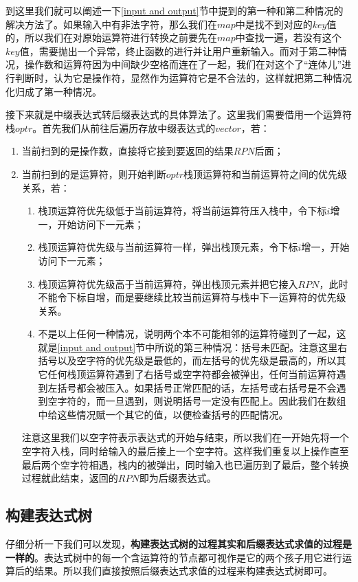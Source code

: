 \documentclass[UTF8]{ctexart}
\begin{document}
		\indent 到这里我们就可以阐述一下\ref{input and output}节中提到的第一种和第二种情况的解决方法了。如果输入中有非法字符，那么我们在$map$中是找不到对应的$key$值的，所以我们在对原始运算符进行转换之前要先在$map$中查找一遍，若没有这个$key$值，需要抛出一个异常，终止函数的进行并让用户重新输入。而对于第二种情况，操作数和运算符因为中间缺少空格而连在了一起，我们在对这个了“连体儿”进行判断时，认为它是操作符，显然作为运算符它是不合法的，这样就把第二种情况化归成了第一种情况。
		
		\indent 接下来就是中缀表达式转后缀表达式的具体算法了。这里我们需要借用一个运算符栈$optr$。首先我们从前往后遍历存放中缀表达式的$vector$，若：
		\begin{enumerate}
			\item 当前扫到的是操作数，直接将它接到要返回的结果$RPN$后面；
			\item 当前扫到的是运算符，则开始判断$optr$栈顶运算符和当前运算符之间的优先级关系，若：
			\begin{enumerate}
				\item 栈顶运算符优先级低于当前运算符，将当前运算符压入栈中，令下标$i$增一，开始访问下一元素；
				\item 栈顶运算符优先级与当前运算符一样，弹出栈顶元素，令下标$i$增一，开始访问下一元素；
				\item 栈顶运算符优先级高于当前运算符，弹出栈顶元素并把它接入$RPN$，此时不能令下标自增，而是要继续比较当前运算符与栈中下一运算符的优先级关系。
				\item 不是以上任何一种情况，说明两个本不可能相邻的运算符碰到了一起，这就是\ref{input and output}节中所说的第三种情况：括号未匹配。注意这里右括号以及空字符的优先级是最低的，而左括号的优先级是最高的，所以其它任何栈顶运算符遇到了右括号或空字符都会被弹出，任何当前运算符遇到左括号都会被压入。如果括号正常匹配的话，左括号或右括号是不会遇到空字符的，而一旦遇到，则说明括号一定没有匹配上。因此我们在数组中给这些情况赋一个其它的值，以便检查括号的匹配情况。
			\end{enumerate}
		\indent 注意这里我们以空字符表示表达式的开始与结束，所以我们在一开始先将一个空字符入栈，同时给输入的最后接上一个空字符。这样我们重复以上操作直至最后两个空字符相遇，栈内的被弹出，同时输入也已遍历到了最后，整个转换过程就此结束，返回的$RPN$即为后缀表达式。
		\end{enumerate}

		
		
		\subsection{构建表达式树}\label{con tree}
		\indent 仔细分析一下我们可以发现，\textbf{构建表达式树的过程其实和后缀表达式求值的过程是一样的}。表达式树中的每一个含运算符的节点都可视作是它的两个孩子用它进行运算后的结果。所以我们直接按照后缀表达式求值的过程来构建表达式树即可。
		
\end{document}
